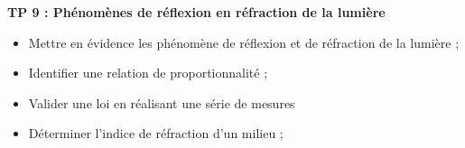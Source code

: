 \modeCorrection

\renewcommand{\thesection}{\textcolor{red}{Partie \Roman{section} -}}
\renewcommand{\thesubsection}{\textcolor{red}{\Roman{section}.\arabic{subsection}}}
\renewcommand{\thesubsubsection}{\textcolor{red}{\Roman{section}.\arabic{subsection}.\alph{subsubsection}}}

\setcounter{section}{0}
\setcounter{document}{0}
\sndEnTeteTPNeuf

\begin{center}
\begin{mdframed}[style=titr, leftmargin=60pt, rightmargin=60pt, innertopmargin=7pt, innerbottommargin=7pt, innerrightmargin=8pt, innerleftmargin=8pt]

\begin{center}
\large{\textbf{TP 9 : Phénomènes de réflexion en réfraction de la lumière
}}
\end{center}
\end{mdframed}
\end{center}



\begin{tcolorbox}[colback=blue!5!white,colframe=blue!75!black,title=Objectifs de la séance :]
\begin{itemize}
    \item Mettre en évidence les phénomène de réflexion et de réfraction de la lumière ;
    \item Identifier une relation de proportionnalité ;
    \item Valider une loi en réalisant une série de mesures 
    \item Déterminer l'indice de réfraction d'un milieu ;
\end{itemize}
\end{tcolorbox}

